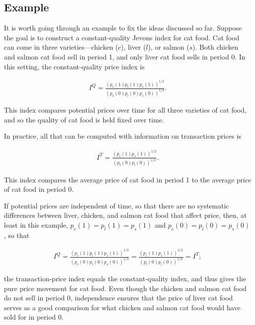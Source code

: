 \documentclass[]{article}
\begin{document}
\hypertarget{example}{%
\subsection{Example}\label{example}}

It is worth going through an example to fix the ideas discussed so far. Suppose the goal is to construct a constant-quality Jevons index for cat food. Cat food can come in three varieties---chicken (\(c\)), liver (\(l\)), or salmon (\(s\)). Both chicken and salmon cat food sell in period 1, and only liver cat food sells in period 0. In this setting, the constant-quality price index is

\begin{align*}
I^{Q} = \frac{(p_{c}(1) p_{l}(1) p_{s}(1))^{1 / 3}}{(p_{c}(0) p_{l}(0) p_{s}(0))^{1 / 3}}.
\end{align*}

This index compares potential prices over time for all three varieties of cat food, and so the quality of cat food is held fixed over time.

In practice, all that can be computed with information on transaction prices is

\begin{align*}
I^{T} = \frac{(p_{c}(1) p_{s}(1))^{1 / 2}}{(p_{l}(0) p_{l}(0))^{1 / 2}}.
\end{align*}

This index compares the average price of cat food in period 1 to the average price of cat food in period 0.

If potential prices are independent of time, so that there are no systematic differences between liver, chicken, and salmon cat food that affect price, then, at least in this example, \(p_{c}(1) = p_{l}(1) = p_{s}(1)\) and \(p_{c}(0) = p_{l}(0) = p_{s}(0)\), so that

\begin{align*}
I^{Q} = \frac{(p_{c}(1) p_{l}(1) p_{s}(1))^{1 / 3}}{(p_{c}(0) p_{l}(0) p_{s}(0))^{1 / 3}} = \frac{(p_{c}(1) p_{s}(1))^{1 / 2}}{(p_{l}(0) p_{l}(0))^{1 / 2}} = I^{T};
\end{align*}

the transaction-price index equals the constant-quality index, and thus gives the pure price movement for cat food. Even though the chicken and salmon cat food do not sell in period 0, independence ensures that the price of liver cat food serves as a good comparison for what chicken and salmon cat food would have sold for in period 0.
\end{document}
